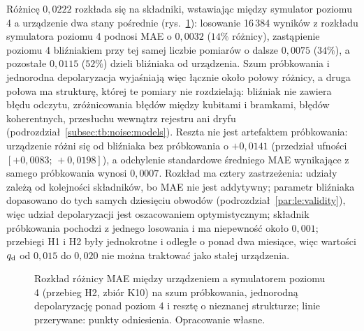 Różnicę $0{,}0222$ rozkłada się na składniki, wstawiając między symulator poziomu 4 a urządzenie dwa stany pośrednie (rys.~\ref{fig:le:gap}): losowanie 16\,384 wyników z rozkładu symulatora poziomu 4 podnosi MAE o $0{,}0032$ ($14\%$ różnicy), zastąpienie poziomu 4 bliźniakiem przy tej samej liczbie pomiarów o dalsze $0{,}0075$ ($34\%$), a pozostałe $0{,}0115$ ($52\%$) dzieli bliźniaka od urządzenia.
Szum próbkowania i jednorodna depolaryzacja wyjaśniają więc łącznie około połowy różnicy, a druga połowa ma strukturę, której te pomiary nie rozdzielają: bliźniak nie zawiera błędu odczytu, zróżnicowania błędów między kubitami i bramkami, błędów koherentnych, przesłuchu wewnątrz rejestru ani dryfu (podrozdział~\ref{subsec:tb:noise:models}).
Reszta nie jest artefaktem próbkowania: urządzenie różni się od bliźniaka bez próbkowania o $+0{,}0141$ (przedział ufności $[+0{,}0083;\,+0{,}0198]$), a odchylenie standardowe średniego MAE wynikające z samego próbkowania wynosi $0{,}0007$.
Rozkład ma cztery zastrzeżenia: udziały zależą od kolejności składników, bo MAE nie jest addytywny; parametr bliźniaka dopasowano do tych samych dziesięciu obwodów (podrozdział~\ref{par:le:validity}), więc udział depolaryzacji jest oszacowaniem optymistycznym; składnik próbkowania pochodzi z jednego losowania i ma niepewność około $0{,}001$; przebiegi H1 i H2 były jednokrotne i odległe o ponad dwa miesiące, więc wartości $q_{\mathrm{d}}$ od $0{,}015$ do $0{,}020$ nie można traktować jako stałej urządzenia.

\begin{figure}[tb]
\centering

\caption[Składniki różnicy błędu rekonstrukcji między urządzeniem a symulatorem]{Rozkład różnicy MAE między urządzeniem a symulatorem poziomu 4 (przebieg H2, zbiór K10) na szum próbkowania, jednorodną depolaryzację ponad poziom 4 i resztę o nieznanej strukturze; linie przerywane: punkty odniesienia. Opracowanie własne.}
\label{fig:le:gap}
\end{figure}


